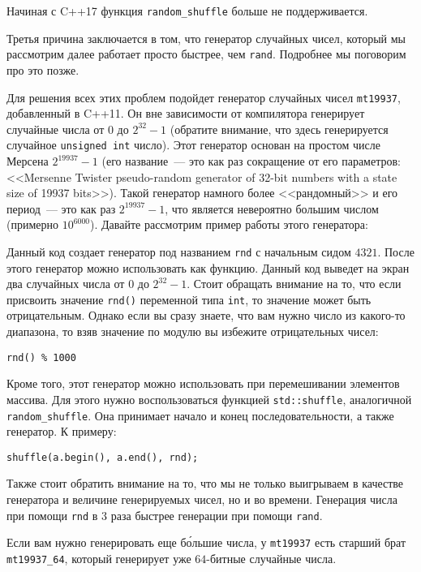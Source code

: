 \begin{observation}
    Начиная с C++17 функция \verb+random_shuffle+ больше не поддерживается.
\end{observation}

Третья причина заключается в том, что генератор случайных чисел, который мы рассмотрим далее работает просто быстрее, чем \verb+rand+. Подробнее мы поговорим про это позже.

Для решения всех этих проблем подойдет генератор случайных чисел \verb+mt19937+, добавленный в C++11. Он вне зависимости от компилятора генерирует случайные числа от $0$ до $2^{32} - 1$ (обратите внимание, что здесь генерируется случайное \verb+unsigned int+ число). Этот генератор основан на простом числе Мерсена $2^{19937} - 1$ (его название~--- это как раз сокращение от его параметров: <<Mersenne Twister pseudo-random generator of 32-bit numbers with a state size of 19937 bits>>). Такой генератор намного более <<рандомный>> и его период~--- это как раз $2^{19937} - 1$, что является невероятно большим числом (примерно $10^{6000}$). Давайте рассмотрим пример работы этого генератора:



Данный код создает генератор под названием \verb+rnd+ с начальным сидом $4321$. После этого генератор можно использовать как функцию. Данный код выведет на экран два случайных числа от $0$ до $2^{32} - 1$. Стоит обращать внимание на то, что если присвоить значение \verb+rnd()+ переменной типа \verb+int+, то значение может быть отрицательным. Однако если вы сразу знаете, что вам нужно число из какого-то диапазона, то взяв значение по модулю вы избежите отрицательных чисел:

\verb+rnd() % 1000+

Кроме того, этот генератор можно использовать при перемешивании элементов массива. Для этого нужно воспользоваться функцией \verb+std::shuffle+, аналогичной \verb+random_shuffle+. Она принимает начало и конец последовательности, а также генератор. К примеру:

\verb+shuffle(a.begin(), a.end(), rnd);+

Также стоит обратить внимание на то, что мы не только выигрываем в качестве генератора и величине генерируемых чисел, но и во времени. Генерация числа при помощи \verb+rnd+ в $3$ раза быстрее генерации при помощи \verb+rand+.

Если вам нужно генерировать еще б\'{о}льшие числа, у \verb+mt19937+ есть старший брат \verb+mt19937_64+, который генерирует уже  $64$-битные случайные числа.

